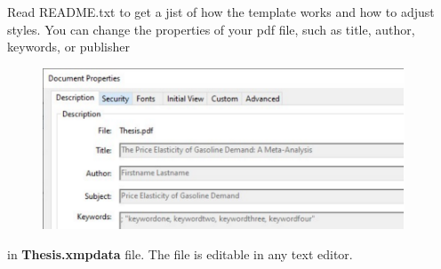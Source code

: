 Read README.txt to get a jist of how the template works and how to adjust styles. You can change the properties of your pdf file, such as title, author, keywords, or publisher

\begin{figure}[!h]
	\centering
		\includegraphics[width=0.96\textwidth]{Figures/properties.pdf}
	\label{fig:properties}
\end{figure}

\noindent in \textbf{Thesis.xmpdata} file. The file is editable in any text editor.



